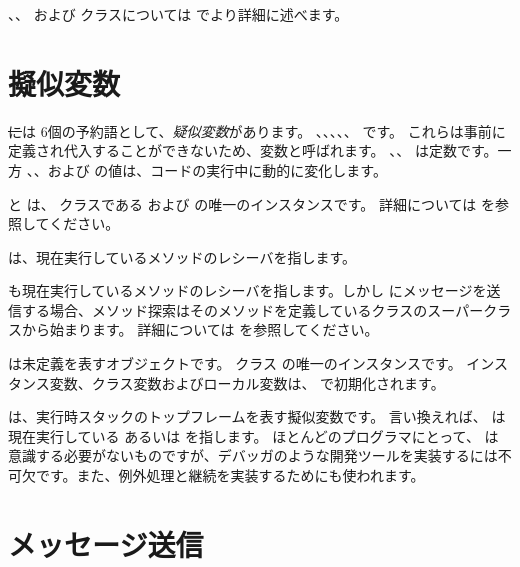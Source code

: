 \documentclass[a4paper,10pt,twoside]{book}
\begin{document}
、、 および  クラスについては  でより詳細に述べます。


\section{擬似変数}

\st には 6個の予約語として、\emph{疑似変数}があります。
、、、、、 です。
これらは事前に定義され代入することができないため、変数と呼ばれます。
、、 は定数です。一方 、、および  の値は、コードの実行中に動的に変化します。

 と  は、 クラスである  および  の唯一のインスタンスです。
詳細については  を参照してください。

 は、現在実行しているメソッドのレシーバを指します。

 も現在実行しているメソッドのレシーバを指します。しかし \super にメッセージを送信する場合、メソッド探索はそのメソッドを定義しているクラスのスーパークラスから始まります。
詳細については  を参照してください。

 は未定義を表すオブジェクトです。
クラス  の唯一のインスタンスです。
インスタンス変数、クラス変数およびローカル変数は、 で初期化されます。

 は、実行時スタックのトップフレームを表す擬似変数です。
言い換えれば、  は現在実行している  あるいは  を指します。
ほとんどのプログラマにとって、 は意識する必要がないものですが、デバッガのような開発ツールを実装するには不可欠です。また、例外処理と継続を実装するためにも使われます。


\section{メッセージ送信}
\end{document}

